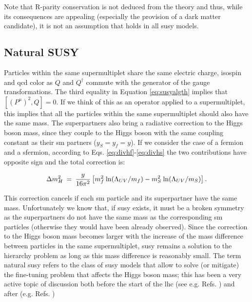 Note that R-parity conservation is not deduced from the theory and thus, while its consequences are appealing (especially the provision of a dark matter candidate), it is not an assumption that holds in all \gls{susy} models.



\subsection{Natural SUSY}

Particles within the same supermultiplet share the same electric charge, isospin and \gls{qcd} color as $Q$ and $Q^\dagger$ commute with the generator of the gauge transformations.
The third equality in Equation \ref{eq:susyalgth} implies that $[ (P^\mu)^2 , Q  ]=0$. If we think of this as an operator applied to a supermultiplet, this implies that all the particles within the same supermultiplet should also have the same mass. The superpartners also bring a radiative correction to the Higgs boson mass, since they couple to the Higgs boson with the same coupling constant as their \gls{sm} partners ($y_S=y_f=y$). If we consider the case of a fermion and a sfermion, according to Eqs. \ref{eq:divhf}-\ref{eq:divhs} the two contributions have opposite sign and the total correction is:

\begin{equation}
\Delta m_H^2 \>=\> {y\over 16 \pi^2}
\left [ m_f^2
\> {\rm ln}(\Lambda_{UV}/m_f) 
- m_S^2
\> {\rm ln}(\Lambda_{UV}/m_S) 
\right ].
\label{eq:divhsusy}
\end{equation}

This correction cancels if each \gls{sm} particle and its superpartner have the same mass. Unfortunately we know that, if \gls{susy} exists, it must be a broken symmetry as the superpartners do not have the same mass as the corresponding \gls{sm} particles (otherwise they would have been already observed). Since the correction to the Higgs boson mass becomes larger with the increase of the mass difference between particles in the same supermultiplet, \gls{susy} remains a solution to the hierarchy problem as long as this mass difference is reasonably small. The term natural \gls{susy} refers to the class of \gls{susy} models that allow to solve (or mitigate) the fine-tuning problem that affects the Higgs boson mass; this has been a very active topic of discussion both before the start of the \gls{lhc} (see e.g. Refs. \cite{BARBIERI198863, Dimopoulos:1995mi}) and after (e.g. Refs. \cite{Papucci:2011wy, Casas:2014eca}) 

